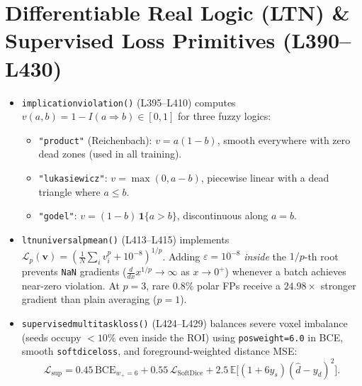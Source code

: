 \documentclass[10pt,a4paper]{article}
\renewcommand{\_}{\origunderscore\allowbreak}
\begin{document}
\section[\texorpdfstring{Differentiable Real Logic (LTN) \& Supervised Loss Primitives (L390--L430)}{Differentiable Real Logic (LTN) & Supervised Loss Primitives (L390--L430)}]{Differentiable Real Logic (LTN) \& Supervised Loss Primitives (L390--L430)}
\begin{annotbox}
\begin{itemize}
    \item \texttt{implication\_violation()} (L395--L410) computes $v(a, b) = 1 - I(a \Rightarrow b) \in [0, 1]$ for three fuzzy logics:
    \begin{itemize}
        \item \texttt{"product"} (Reichenbach): $v = a(1 - b)$, smooth everywhere with zero dead zones (used in all training).
        \item \texttt{"lukasiewicz"}: $v = \max(0, a - b)$, piecewise linear with a dead triangle where $a \le b$.
        \item \texttt{"godel"}: $v = (1 - b)\,\mathbf{1}\{a > b\}$, discontinuous along $a = b$.
    \end{itemize}
    \item \texttt{ltn\_universal\_pmean()} (L413--L415) implements $\mathcal{L}_p(\mathbf{v}) = (\frac{1}{N}\sum_i v_i^p + 10^{-8})^{1/p}$. Adding $\varepsilon = 10^{-8}$ \emph{inside} the $1/p$-th root prevents \texttt{NaN} gradients ($\frac{d}{dx} x^{1/p} \to \infty$ as $x \to 0^+$) whenever a batch achieves near-zero violation. At $p = 3$, rare $0.8\%$ polar FPs receive a $24.98\times$ stronger gradient than plain averaging ($p = 1$).
    \item \texttt{supervised\_multitask\_loss()} (L424--L429) balances severe voxel imbalance (seeds occupy $<10\%$ even inside the ROI) using \texttt{pos\_weight=6.0} in BCE, smooth \texttt{soft\_dice\_loss}, and foreground-weighted distance MSE:
    \[
        \mathcal{L}_{\text{sup}} = 0.45\,\text{BCE}_{w_+=6} + 0.55\,\mathcal{L}_{\text{SoftDice}} + 2.5\,\mathbb{E}\bigl[(1 + 6 y_s)(\hat{d} - y_d)^2\bigr].
    \]
\end{itemize}
\end{annotbox}
\end{document}
